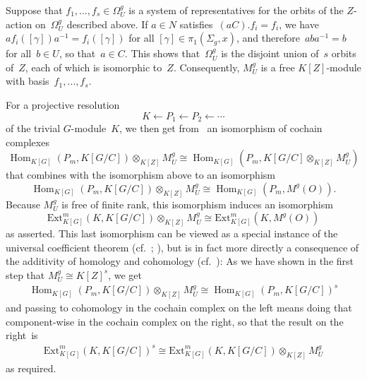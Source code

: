 \documentclass[12pt]{article}
\makeatletter
\theoremstyle{definition}
\theoremstyle{break}
\renewenvironment{proof}[1][\proofname]{\par
\vspace{-5pt}%
\pushQED{\qed}%
\normalfont
\topsep0pt \partopsep0pt %
\trivlist
\item[\hskip\labelsep
\bfseries
#1\@addpunct{.}]\ignorespaces
}{%
\popQED\endtrivlist\@endpefalse
\addvspace{6pt plus 6pt} %
}
\DeclareMathOperator\Hom{Hom}
\newcommand{\Ext}{\mathrm{Ext}}
\renewcommand{\1}{\mathbbm{1}}
\newcommand{\ot}{\mathbin{\otimes}}
\makeatother
\begin{document}
\begin{proof}
\begin{parlist}
\item
Suppose that $f_1,\dots,f_s \in \Omega_U^{g}$ is a system of representatives for the orbits of the $Z$-action on~$\Omega_U^{g}$ described above. If $a \in N$ satisfies~$(aC).f_i = f_i$, we have~$a f_i([\gamma]) a^{-1} = f_i([\gamma])$ for all $[\gamma] \in \pi_1(\Sigma_g,x)$, and  therefore~$a b a^{-1} = b$ for all~$b \in U$, so that~$a \in C$. This shows that~$\Omega_U^{g}$
is the disjoint union of~$s$ orbits of~$Z$, each of which is isomorphic to~$Z$. Consequently,
$M_U^{g}$ is a free $K[Z]$-module with basis~$f_1,\dots,f_s$.

\item
For a projective resolution
\[K \longleftarrow P_1 \longleftarrow P_2 \longleftarrow \cdots \]
of the trivial $G$-module~$K$, we then get from~\cite[Chap.~II, \S~4.2, Prop.~2, p.~269]{Bo} an isomorphism of cochain complexes
\[\Hom_{K[G]}(P_m, K[G/C]) \ot_{K[Z]} M_U^{g} \cong
\Hom_{K[G]}(P_m, K[G/C] \ot_{K[Z]} M_U^{g})\]
that combines with the isomorphism above to an isomorphism
\[\Hom_{K[G]}(P_m, K[G/C]) \ot_{K[Z]} M_U^{g} \cong
\Hom_{K[G]}(P_m, M^g(O)).\]
Because $M_U^{g}$ is free of finite rank, this isomorphism induces an isomorphism
\[\Ext^m_{K[G]}(K, K[G/C]) \ot_{K[Z]} M_U^{g} \cong
\Ext^m_{K[G]}(K, M^g(O))\]
as asserted. This last isomorphism can be viewed as a special instance of the universal coefficient theorem (cf.~\cite[Sec.~3.4, p.~30]{E}; \cite[Thm.~7.55, p.~448]{Ro}), but is in fact more directly a consequence of the additivity of homology and cohomology (cf.~\cite[Prop.~6.8, p.~330]{Ro}): As we have shown in the first step that $M_U^{g} \cong K[Z]^s$, we get
\begin{align*}
\Hom_{K[G]}(P_m, K[G/C]) \ot_{K[Z]} M_U^{g} \cong \Hom_{K[G]}(P_m, K[G/C])^s
\end{align*}
and passing to cohomology in the cochain complex on the left means doing that component-wise in the cochain complex on the right, so that the result on the right~is
\begin{align*}
\Ext^m_{K[G]}(K, K[G/C])^s \cong \Ext^m_{K[G]}(K, K[G/C]) \ot_{K[Z]} M_U^{g}
\end{align*}
as required.
\qedhere
\end{parlist}
\end{proof}
\end{document}
